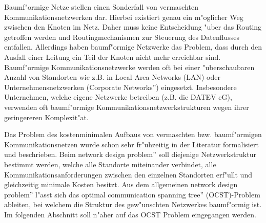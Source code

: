 Baumf"ormige Netze stellen einen Sonderfall von vermaschten Kommunikationsnetzwerken dar. Hierbei existiert genau ein m"oglicher Weg zwischen den Knoten im Netz. Daher muss keine Entscheidung "uber das Routing getroffen werden und Routingmechanismen zur Steuerung des Datenflusses entfallen. Allerdings haben baumf"ormige Netzwerke das Problem, dass durch den Ausfall einer Leitung ein Teil der Knoten nicht mehr erreichbar sind. Baumf"ormige Kommunikationsnetzwerke werden oft bei einer "uberschaubaren Anzahl von Standorten wie z.B. in Local Area Networks (LAN) oder Unternehmensnetzwerken (\glqq Corporate Networks'') eingesetzt. Insbesondere Unternehmen, welche eigene Netzwerke betreiben (z.B. die DATEV eG), verwenden oft baum\-f"or\-mi\-ge Kommunikationsnetzwerkstrukturen wegen ihrer geringereren Komplexit"at. 

Das Problem des kostenminimalen Aufbaus von vermaschten bzw. baumf"ormigen Kommunikationsnetzen wurde schon sehr fr"uhzeitig in der Literatur formalisiert und beschrieben. Beim \glqq network design problem'' \citep{Johnson:78} soll diejenige Netzwerkstruktur bestimmt werden, welche alle Standorte miteinander verbindet, alle Kommunikationsanforderungen zwischen den einzelnen Standorten erf"ullt und gleichzeitig minimale Kosten besitzt. Aus dem allgemeinen \glqq network design problem'' l"asst sich das \glqq optimal communication spanning tree'' (OCST)-Problem ableiten, bei welchem die Struktur des gew"unschten Netzwerkes baumf"ormig ist. Im folgenden Abschnitt soll n"aher auf das OCST Problem eingegangen werden.

